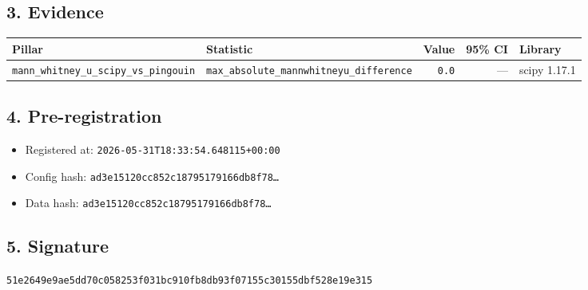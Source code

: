 \documentclass{article}
\begin{document}
\subsection*{3. Evidence}
\begin{tabular}{llrrl}\toprule
\textbf{Pillar} & \textbf{Statistic} & \textbf{Value} & \textbf{95\% CI} & \textbf{Library} \\\midrule
\texttt{mann\_whitney\_u\_scipy\_vs\_pingouin} & \texttt{max\_absolute\_mannwhitneyu\_difference} & \texttt{0.0} & --- & scipy 1.17.1 \\
\bottomrule\end{tabular}
\subsection*{4. Pre-registration}
\begin{itemize}
\item Registered at: \texttt{2026-05-31T18:33:54.648115+00:00}
\item Config hash: \texttt{ad3e15120cc852c18795179166db8f78\dots}
\item Data hash: \texttt{ad3e15120cc852c18795179166db8f78\dots}
\end{itemize}
\subsection*{5. Signature}
\texttt{51e2649e9ae5dd70c058253f031bc910fb8db93f07155c30155dbf528e19e315}\\
\end{document}
